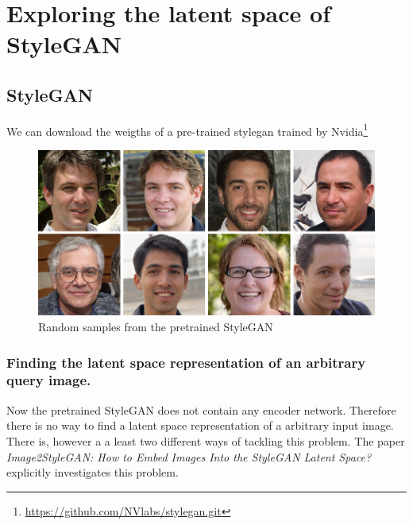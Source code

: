 \chapter{Exploring the latent space of StyleGAN}




\section{StyleGAN}

We can download the weigths of a pre-trained stylegan trained by Nvidia\footnote{\url{
https://github.com/NVlabs/stylegan.git}}\cite{stylegan}

\begin{figure}
  \includegraphics[width=\textwidth]{fig/stylegan/randomsamples}
  \caption{Random samples from the pretrained StyleGAN}
  \label{StyleGAN-examples}
\end{figure}




\subsection{Finding the latent space representation of an arbitrary query image.}
Now the pretrained StyleGAN does not contain any encoder network. Therefore there is no way to find a latent space representation of a arbitrary input image.
There is, however a a least two different ways of tackling this problem.
%
\cite{interfacegan}
The paper \textit{Image2StyleGAN: How to Embed Images Into the StyleGAN Latent Space?}\cite{Image2StyleGAN} explicitly investigates this problem.


